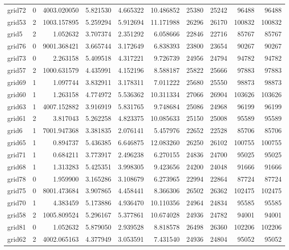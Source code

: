 \begin{longtable}{|l|r|r|r|r|r|r|r|r|r|}
grid72 & 0 & 4003.020050 & 5.821530 & 4.665322 & 10.486852 & 25380 & 25242 & 96488 & 96488 \\
grid53 & 2 & 1003.157895 & 5.259294 & 5.912694 & 11.171988 & 26296 & 26170 & 100832 & 100832 \\
grid5 & 2 & 1.052632 & 3.707374 & 2.351292 & 6.058666 & 22846 & 22716 & 85767 & 85767 \\
grid76 & 0 & 9001.368421 & 3.665744 & 3.172649 & 6.838393 & 23800 & 23654 & 90267 & 90267 \\
grid73 & 0 & 2.263158 & 5.409518 & 4.317221 & 9.726739 & 24956 & 24794 & 94782 & 94782 \\
grid57 & 2 & 1000.631579 & 4.435991 & 4.152196 & 8.588187 & 25822 & 25666 & 97883 & 97883 \\
grid69 & 1 & 1.097744 & 3.832911 & 3.178311 & 7.011222 & 25680 & 25550 & 98873 & 98873 \\
grid60 & 1 & 1.263158 & 4.774972 & 5.536362 & 10.311334 & 27066 & 26904 & 103626 & 103626 \\
grid63 & 1 & 4007.152882 & 3.916919 & 5.831765 & 9.748684 & 25086 & 24968 & 96199 & 96199 \\
grid61 & 2 & 3.817043 & 5.262258 & 4.823375 & 10.085633 & 25150 & 25008 & 95589 & 95589 \\
grid6 & 1 & 7001.947368 & 3.381835 & 2.076141 & 5.457976 & 22652 & 22528 & 85706 & 85706 \\
grid65 & 1 & 0.894737 & 5.436385 & 6.646875 & 12.083260 & 26250 & 26102 & 100755 & 100755 \\
grid71 & 1 & 0.684211 & 3.773917 & 2.496238 & 6.270155 & 24836 & 24700 & 95025 & 95025 \\
grid68 & 1 & 1.313283 & 5.425351 & 3.998305 & 9.423656 & 24200 & 24048 & 91666 & 91666 \\
grid78 & 0 & 1.959900 & 3.165286 & 3.108679 & 6.273965 & 22994 & 22864 & 87724 & 87724 \\
grid75 & 0 & 8001.473684 & 3.907865 & 4.458441 & 8.366306 & 26502 & 26362 & 102475 & 102475 \\
grid70 & 1 & 4.383459 & 5.173886 & 4.936470 & 10.110356 & 24964 & 24834 & 95585 & 95585 \\
grid58 & 2 & 1005.809524 & 5.296167 & 5.377861 & 10.674028 & 24936 & 24782 & 94001 & 94001 \\
grid81 & 0 & 1.052632 & 5.879050 & 2.939528 & 8.818578 & 26498 & 26360 & 102206 & 102206 \\
grid62 & 2 & 4002.065163 & 4.377949 & 3.053591 & 7.431540 & 24936 & 24804 & 95052 & 95052 \\

\end{longtable}
